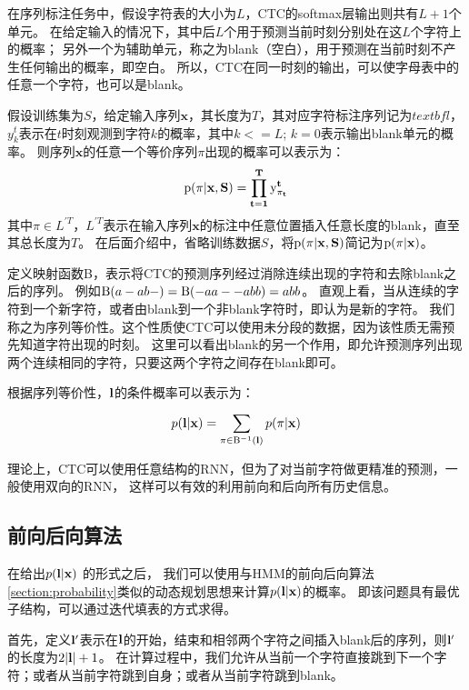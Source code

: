在序列标注任务中，假设字符表的大小为$L$，CTC的softmax层输出则共有$L+1$个单元。
在给定输入的情况下，其中后$L$个用于预测当前时刻分别处在这$L$个字符上的概率；
另外一个为辅助单元，称之为blank（空白），用于预测在当前时刻不产生任何输出的概率，即空白。
所以，CTC在同一时刻的输出，可以使字母表中的任意一个字符，也可以是blank。

假设训练集为$S$，给定输入序列$\textbf{x}$，其长度为$T$，其对应字符标注序列记为$textbf{l}$，
$y_k^t$表示在$t$时刻观测到字符$k$的概率，其中$k<=L$; $k=0$表示输出blank单元的概率。
则序列$\textbf{x}$的任意一个等价序列$\pi$出现的概率可以表示为：
\begin{equation}
\label{euqation:ctcpath}
{\rm{p}}(\pi |\bf{x},S) = \prod\limits_{t = 1}^T {{\rm{y}}_{{\pi _t}}^t}
\end{equation}
其中$\pi  \in {L^{'T}}$，$L^{'T}$表示在输入序列$\textbf{x}$的标注中任意位置插入任意长度的blank，直至其总长度为$T$。
在后面介绍中，省略训练数据$S$，将$\rm{p}(\pi |\bf{x},S)$简记为$\rm{p}(\pi|\bf{x})$。

定义映射函数{\rm B}，表示将CTC的预测序列经过消除连续出现的字符和去除blank之后的序列。
例如${\rm B}(a - ab - ) = {\rm B}( - aa -  - abb) = abb$。
直观上看，当从连续的字符到一个新字符，或者由blank到一个非blank字符时，即认为是新的字符。
我们称之为序列等价性。这个性质使CTC可以使用未分段的数据，因为该性质无需预先知道字符出现的时刻。
这里可以看出blank的另一个作用，即允许预测序列出现两个连续相同的字符，只要这两个字符之间存在blank即可。

根据序列等价性，$\bf{l}$的条件概率可以表示为：
\begin{equation}
\label{euqation:ctcallpath}
p({\bf{l}}|{\bf{x}}) = \sum\limits_{\pi  \in {{\rm B}^{ - 1}}({\bf{l}})}^{} {p(\pi |{\bf{x}})}
\end{equation}

理论上，CTC可以使用任意结构的RNN，但为了对当前字符做更精准的预测，一般使用双向的RNN，
这样可以有效的利用前向和后向所有历史信息。

\subsection{前向后向算法}

在给出$p({\bf{l}}|{\bf{x}})$ 的形式之后，
我们可以使用与HMM的前向后向算法\ref{section:probability}类似的动态规划思想来计算$p({\bf{l}}|{\bf{x}})$的概率。
即该问题具有最优子结构，可以通过迭代填表的方式求得。

首先，定义${{\bf{l'}}}$表示在$\bf{l}$的开始，结束和相邻两个字符之间插入blank后的序列，则${{\bf{l'}}}$的长度为$2|{\bf{l}}| + 1$。
在计算过程中，我们允许从当前一个字符直接跳到下一个字符；或者从当前字符跳到自身；或者从当前字符跳到blank。

